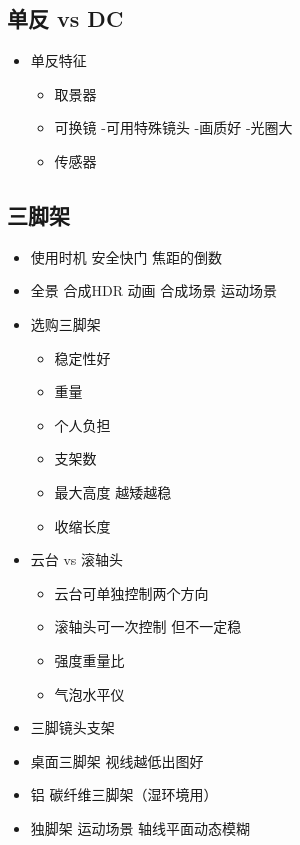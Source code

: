 \documentclass[
  letterpaper,
  DIV=11,
  numbers=noendperiod]{scrreprt}
\providecommand{\tightlist}{%
  \setlength{\itemsep}{0pt}\setlength{\parskip}{0pt}}\usepackage{longtable,booktabs,array}
\begin{document}
\subsection{单反 vs DC}\label{ux5355ux53cd-vs-dc}

\begin{itemize}
\tightlist
\item
  单反特征

  \begin{itemize}
  \tightlist
  \item
    取景器
  \item
    可换镜 -可用特殊镜头 -画质好 -光圈大
  \item
    传感器
  \end{itemize}
\end{itemize}

\subsection{三脚架}\label{ux4e09ux811aux67b6}

\begin{itemize}
\tightlist
\item
  使用时机 安全快门 焦距的倒数
\item
  全景 合成HDR 动画 合成场景 运动场景
\item
  选购三脚架

  \begin{itemize}
  \tightlist
  \item
    稳定性好
  \item
    重量
  \item
    个人负担
  \item
    支架数
  \item
    最大高度 越矮越稳
  \item
    收缩长度
  \end{itemize}
\item
  云台 vs 滚轴头

  \begin{itemize}
  \tightlist
  \item
    云台可单独控制两个方向
  \item
    滚轴头可一次控制 但不一定稳
  \item
    强度重量比
  \item
    气泡水平仪
  \end{itemize}
\item
  三脚镜头支架
\item
  桌面三脚架 视线越低出图好
\item
  铝 碳纤维三脚架（湿环境用）
\item
  独脚架 运动场景 轴线平面动态模糊
\end{itemize}
\end{document}
